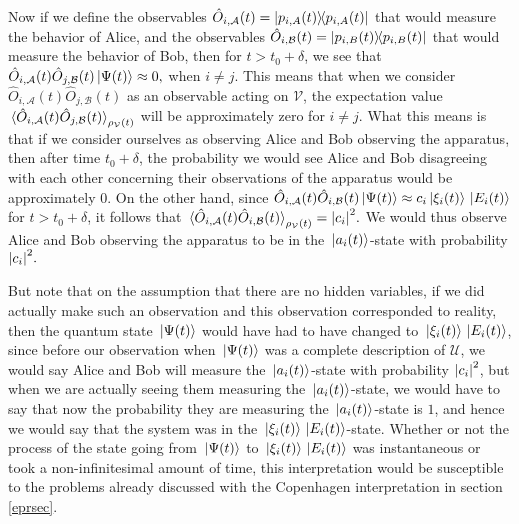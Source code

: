     Now if we define the observables $\hat{O}_{i,\mathcal{A}}(t)=\dyad{p_{i,A}(t)}$ that %
%
    would measure the behavior of Alice, and the observables $\hat{O}_{i,\mathcal{B}}(t)=\dyad{p_{i,B}(t)}$ that would measure the behavior of Bob, then for $t>t_0+\delta$, we see that $\hat{O}_{i,\mathcal{A}}(t)\hat{O}_{j,\mathcal{B}}(t)\ket*{\Psi(t)}\approx 0,$ when $i\neq j$. This means that when we consider $\hat{O}_{i,\mathcal{A}}(t)\hat{O}_{j,\mathcal{B}}(t)$ as an observable acting on $\mathcal{V}$,  the expectation value $\ev*{\hat{O}_{i,\mathcal{A}}(t)\hat{O}_{j,\mathcal{B}}(t)}_{\rho_\mathcal{V}(t)}$ will be approximately zero for $i\neq j$. What this means is that if we consider ourselves as observing Alice and Bob observing the apparatus, then after time $t_0+\delta$, the probability we would see Alice and Bob disagreeing with each other concerning their observations of the apparatus would be approximately 0. 
     On the other hand, since $\hat{O}_{i,\mathcal{A}}(t)\hat{O}_{i,\mathcal{B}}(t)\ket*{\Psi(t)} \approx c_i \ket*{\xi_i(t)}\ket*{E_i(t)}$ for $t>t_0+\delta$, it follows that $\ev*{\hat{O}_{i,\mathcal{A}}(t)\hat{O}_{i,\mathcal{B}}(t)}_{\rho_\mathcal{V}(t)}=\abs{c_i}^2.$ 
     We would thus observe Alice and Bob observing the apparatus to be in the $\ket*{a_i(t)}$-state with probability $\abs{c_i}^2.$ 
     
     But note that on the assumption that there are no hidden variables, if we did actually make such an observation and this observation corresponded to reality, then the quantum state $\ket*{\Psi(t)}$ would have had to have changed to $\ket*{\xi_i(t)}\ket*{E_i(t)}$, since before our observation when $\ket*{\Psi(t)}$ was a complete description of $\mathcal{U}$, we would say Alice and Bob will measure the $\ket*{a_i(t)}$-state with probability $\abs{c_i}^2$, but when we are actually seeing them measuring the $\ket*{a_i(t)}$-state, we would have to say that now the probability they are measuring the $\ket*{a_i(t)}$-state is $1$, and hence we would say that the system was in the $\ket*{\xi_i(t)}\ket*{E_i(t)}$-state. Whether or not the process of the state going from $\ket*{\Psi(t)}$ to $\ket*{\xi_i(t)}\ket*{E_i(t)}$ was instantaneous or took a non-infinitesimal amount of time, this interpretation would be susceptible to the problems already discussed with the Copenhagen interpretation in section \ref{eprsec}.
    
